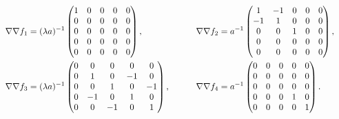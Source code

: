 \begin{equation}
\begin{aligned}
  \nabla\nabla f_1 &=
  (\lambda a)^{-1}\begin{pmatrix}
    1 & 0 & 0 & 0 & 0 \\
    0 & 0 & 0 & 0 & 0 \\
    0 & 0 & 0 & 0 & 0 \\
    0 & 0 & 0 & 0 & 0 \\
    0 & 0 & 0 & 0 & 0 \\
  \end{pmatrix},\qquad {}&
  \nabla\nabla f_2 &= a^{-1}
  \begin{pmatrix}
    1 & -1 & 0 & 0 & 0 \\
    -1 & 1 & 0 & 0 & 0 \\
    0 & 0 & 1 & 0 & 0 \\
    0 & 0 & 0 & 0 & 0 \\
    0 & 0 & 0 & 0 & 0 \\
  \end{pmatrix},\qquad\\
  \nabla\nabla f_3 &=
  (\lambda a)^{-1}\begin{pmatrix}
    0 & 0 & 0 & 0 & 0 \\
    0 & 1 & 0 & -1 & 0 \\
    0 & 0 & 1 & 0 & -1 \\
    0 & -1 & 0 & 1 & 0 \\
    0 & 0 & -1 & 0 & 1 \\
  \end{pmatrix},\qquad {}&
  \nabla\nabla f_4 &= a^{-1}
  \begin{pmatrix}
      0 & 0 & 0 & 0 & 0 \\
      0 & 0 & 0 & 0 & 0 \\
      0 & 0 & 0 & 0 & 0 \\
      0 & 0 & 0 & 1 & 0 \\
      0 & 0 & 0 & 0 & 1 \\
  \end{pmatrix}.
\end{aligned}
\end{equation}

